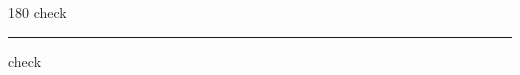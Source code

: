 
\begin{frame}
\begin{center}
\begin{turn}{180}
{\fontsize{2.5cm}{1em}\selectfont check}
\end{turn}
\vspace{1em}\par  
\hrule
\vspace{1em}\par  
{\fontsize{2.5cm}{1em}\selectfont check}
\end{center}
\end{frame}
